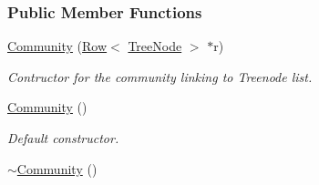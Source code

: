 \subsubsection*{Public Member Functions}
\begin{DoxyCompactItemize}
\item 
\hyperlink{group___community_objects_a7697e887d12366a6953fe7439d978768}{Community} (\hyperlink{class_row}{Row}$<$ \hyperlink{class_tree_node}{Tree\+Node} $>$ $\ast$r)
\begin{DoxyCompactList}\small\item\em Contructor for the community linking to Treenode list. \end{DoxyCompactList}\item 
\hyperlink{group___community_objects_a995bd6adbfb7a4aad1bc5fb74e2a8ef2}{Community} ()\hypertarget{group___community_objects_a995bd6adbfb7a4aad1bc5fb74e2a8ef2}{}\label{group___community_objects_a995bd6adbfb7a4aad1bc5fb74e2a8ef2}

\begin{DoxyCompactList}\small\item\em Default constructor. \end{DoxyCompactList}\item 
\hyperlink{group___community_objects_a9ed3b94e90b38497805610de6d18df4e}{$\sim$\+Community} ()\hypertarget{group___community_objects_a9ed3b94e90b38497805610de6d18df4e}{}\label{group___community_objects_a9ed3b94e90b38497805610de6d18df4e}


\end{DoxyCompactItemize}
